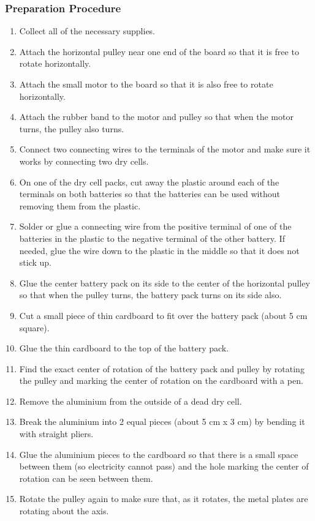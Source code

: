 \subsubsection*{Preparation Procedure}
\begin{enumerate}
\item{Collect all of the necessary supplies.} 
\item{Attach the horizontal pulley near one end of the board so that it is free to rotate horizontally.} 
\item{Attach the small motor to the board so that it is also free to rotate horizontally.} 
\item{Attach the rubber band to the motor and pulley so that when the motor turns, the pulley also turns.} 
\item{Connect two connecting wires to the terminals of the motor and make sure it works by connecting two dry cells.} 
\item{On one of the dry cell packs, cut away the plastic around each of the terminals on both batteries so that the batteries can be used without removing them from the plastic.} 
\item{Solder or glue a connecting wire from the positive terminal of one of the batteries in the plastic to the negative terminal of the other battery. If needed, glue the wire down to the plastic in the middle so that it does not stick up.} 
\item{Glue the center battery pack on its side to the center of the horizontal pulley so that when the pulley turns, the battery pack turns on its side also.} 
\item{Cut a small piece of thin cardboard to fit over the battery pack (about 5 cm square).} 
\item{Glue the thin cardboard to the top of the battery pack.} 
\item{Find the exact center of rotation of the battery pack and pulley by rotating the pulley and marking the center of rotation on the cardboard with a pen.} 
\item{Remove the aluminium from the outside of a dead dry cell.} 
\item{Break the aluminium into 2 equal pieces (about 5 cm x 3 cm) by bending it with straight pliers.} 
\item{Glue the aluminium pieces to the cardboard so that there is a small space between them (so electricity cannot pass) and the hole marking the center of rotation can be seen between them.} 
\item{Rotate the pulley again to make sure that, as it rotates, the metal plates are rotating about the axis.} 

\end{enumerate}
